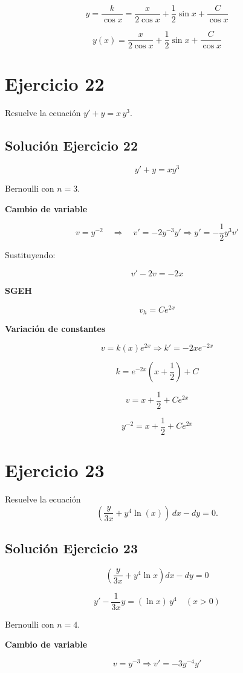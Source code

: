 \documentclass[12pt]{article}
\begin{document}
\[
y = \frac{k}{\cos x}
= \frac{x}{2\cos x} + \frac{1}{2}\sin x + \frac{C}{\cos x}
\]

\[
\boxed{
y(x) =
\frac{x}{2\cos x}
+ \frac{1}{2}\sin x
+ \frac{C}{\cos x}
}
\]

\section*{Ejercicio 22}
Resuelve la ecuación $y' + y = x\,y^3$.

\subsection*{Solución Ejercicio 22}

\[
y' + y = xy^3
\]

Bernoulli con \(n=3\).

\textbf{Cambio de variable}

\[
v = y^{-2}
\quad\Rightarrow\quad
v' = -2y^{-3}y'
\Rightarrow
y' = -\frac{1}{2}y^3 v'
\]

Sustituyendo:

\[
v' - 2v = -2x
\]

\textbf{SGEH}

\[
v_h = C e^{2x}
\]

\textbf{Variación de constantes}

\[
v = k(x)e^{2x}
\Rightarrow
k' = -2x e^{-2x}
\]

\[
k = e^{-2x}\left(x+\frac{1}{2}\right) + C
\]

\[
v = x + \frac{1}{2} + C e^{2x}
\]

\[
\boxed{y^{-2} = x + \frac{1}{2} + C e^{2x}}
\]

\section*{Ejercicio 23}
Resuelve la ecuación
\[
\left(\dfrac{y}{3x} + y^4 \ln(x)\right)\,dx - dy = 0.
\]

\subsection*{Solución Ejercicio 23}

\[
\left(\frac{y}{3x} + y^4 \ln x\right) dx - dy = 0
\]

\[
y' - \frac{1}{3x}y = (\ln x)\,y^4
\quad (x>0)
\]

Bernoulli con \(n=4\).

\textbf{Cambio de variable}

\[
v = y^{-3}
\Rightarrow
v' = -3y^{-4}y'
\]
\end{document}
